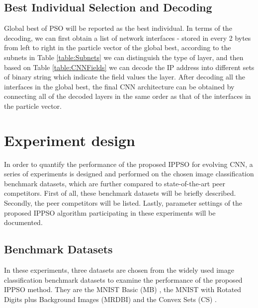 \documentclass[conference]{IEEEtran}
\begin{document}
\subsection{Best Individual Selection and Decoding}

Global best of PSO will be reported as the best individual. In terms of the decoding, we can first obtain a list of network interfaces - stored in every 2 bytes from left to right in the particle vector of the global best, according to the subnets in Table \ref{table:Subnets} we can distinguish the type of layer, and then based on Table \ref{table:CNNFields} we can decode the IP address into different sets of binary string which indicate the field values the layer. After decoding all the interfaces in the global best, the final CNN architecture can be obtained by connecting all of the decoded layers in the same order as that of the interfaces in the particle vector.

\section{Experiment design}\label{sec:EPDesign}

In order to quantify the performance of the proposed IPPSO for evolving CNN, a series of experiments is designed and performed on the chosen image classification benchmark datasets, which are further compared to state-of-the-art peer competitors. First of all, these benchmark datasets will be briefly described. Secondly, the peer competitors will be listed. Lastly, parameter settings of the proposed IPPSO algorithm participating in these experiments will be documented.

\subsection{Benchmark Datasets}

In these experiments, three datasets are chosen from the widely used image classification benchmark datasets to examine the performance of the proposed IPPSO method. They are the MNIST Basic (MB) \cite{DeepArchitectureEval:Larochelle}, the MNIST with Rotated Digits plus Background Images (MRDBI) \cite{DeepArchitectureEval:Larochelle} and the Convex Sets (CS) \cite{DeepArchitectureEval:Larochelle}. 
\end{document}
